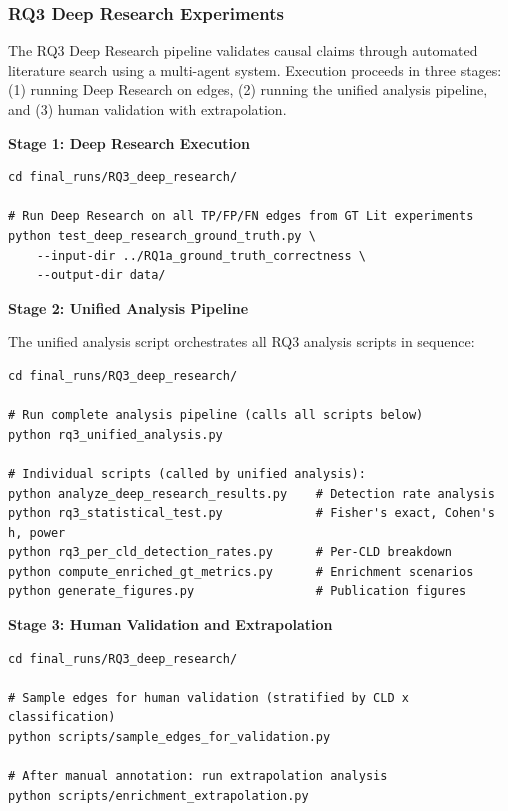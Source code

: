 \subsubsection{RQ3 Deep Research Experiments}
\label{sec:rq3_execution}

The RQ3 Deep Research pipeline validates causal claims through automated literature search using a multi-agent system. Execution proceeds in three stages: (1) running Deep Research on edges, (2) running the unified analysis pipeline, and (3) human validation with extrapolation.

\textbf{Stage 1: Deep Research Execution}

\begin{verbatim}
cd final_runs/RQ3_deep_research/

# Run Deep Research on all TP/FP/FN edges from GT Lit experiments
python test_deep_research_ground_truth.py \
    --input-dir ../RQ1a_ground_truth_correctness \
    --output-dir data/
\end{verbatim}

\textbf{Stage 2: Unified Analysis Pipeline}

The unified analysis script orchestrates all RQ3 analysis scripts in sequence:

\begin{verbatim}
cd final_runs/RQ3_deep_research/

# Run complete analysis pipeline (calls all scripts below)
python rq3_unified_analysis.py

# Individual scripts (called by unified analysis):
python analyze_deep_research_results.py    # Detection rate analysis
python rq3_statistical_test.py             # Fisher's exact, Cohen's h, power
python rq3_per_cld_detection_rates.py      # Per-CLD breakdown
python compute_enriched_gt_metrics.py      # Enrichment scenarios
python generate_figures.py                 # Publication figures
\end{verbatim}

\textbf{Stage 3: Human Validation and Extrapolation}

\begin{verbatim}
cd final_runs/RQ3_deep_research/

# Sample edges for human validation (stratified by CLD x classification)
python scripts/sample_edges_for_validation.py

# After manual annotation: run extrapolation analysis
python scripts/enrichment_extrapolation.py
\end{verbatim}

